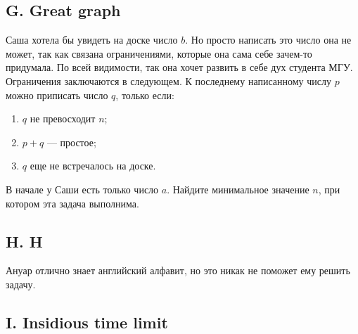 




\subsection*{G. Great graph}

Саша хотела бы увидеть на доске число $b$. Но просто написать это число она не может, так как связана ограничениями, которые она сама себе зачем-то придумала. По всей видимости, так она хочет развить в себе дух студента МГУ. Ограничения заключаются в следующем. К последнему написанному числу $p$ можно приписать число $q$, только если:
\begin{enumerate}
\item $q$ не превосходит $n$;
\item $p+q$ --- простое;
\item $q$ еще не встречалось на доске.
\end{enumerate}
В начале у Саши есть только число $a$. Найдите минимальное значение $n$, при котором эта задача выполнима.





\subsection*{H. H}

Ануар отлично знает английский алфавит, но это никак не поможет ему решить задачу.





\subsection*{I. Insidious time limit}

